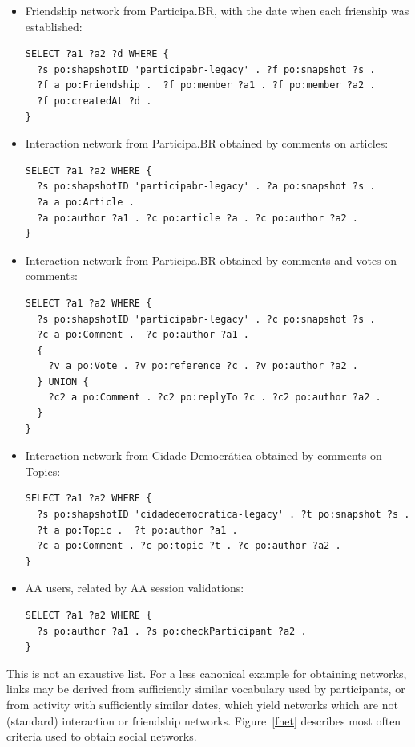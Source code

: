 \documentclass[data,datadescriptor,submit,moreauthors,pdftex]{Definitions/mdpi}
\begin{document}
\begin{itemize}
\begin{lstlisting}[language=spq]
}
\end{lstlisting}
  \item Friendship network from Participa.BR, with the date when each frienship was established:
\begin{lstlisting}[language=spq]
SELECT ?a1 ?a2 ?d WHERE { 
  ?s po:shapshotID 'participabr-legacy' . ?f po:snapshot ?s .
  ?f a po:Friendship .  ?f po:member ?a1 . ?f po:member ?a2 .
  ?f po:createdAt ?d .
}
\end{lstlisting}
  \item Interaction network from Participa.BR obtained by comments on articles:
\begin{lstlisting}[language=spq]
SELECT ?a1 ?a2 WHERE {
  ?s po:shapshotID 'participabr-legacy' . ?a po:snapshot ?s .
  ?a a po:Article .
  ?a po:author ?a1 . ?c po:article ?a . ?c po:author ?a2 .
}
\end{lstlisting}
  \item Interaction network from Participa.BR obtained by comments and votes on comments:
\begin{lstlisting}[language=spq]
SELECT ?a1 ?a2 WHERE { 
  ?s po:shapshotID 'participabr-legacy' . ?c po:snapshot ?s .
  ?c a po:Comment .  ?c po:author ?a1 .
  {
    ?v a po:Vote . ?v po:reference ?c . ?v po:author ?a2 .
  } UNION {
    ?c2 a po:Comment . ?c2 po:replyTo ?c . ?c2 po:author ?a2 .
  }
}
\end{lstlisting}
  \item Interaction network from Cidade Democrática obtained by comments on Topics:
\begin{lstlisting}[language=spq]
SELECT ?a1 ?a2 WHERE { 
  ?s po:shapshotID 'cidadedemocratica-legacy' . ?t po:snapshot ?s .
  ?t a po:Topic .  ?t po:author ?a1 .
  ?c a po:Comment . ?c po:topic ?t . ?c po:author ?a2 .
}
\end{lstlisting}
  \item AA users, related by AA session validations:
\begin{lstlisting}[language=spq]
SELECT ?a1 ?a2 WHERE { 
  ?s po:author ?a1 . ?s po:checkParticipant ?a2 .
}
\end{lstlisting}
\end{itemize}

This is not an exaustive list.
For a less canonical example for obtaining networks,
links may be derived from sufficiently similar vocabulary used by participants,
or from activity with sufficiently similar dates,
which yield networks which are not (standard) interaction or friendship networks.
Figure~\ref{fnet} describes most often criteria used to obtain social networks.
\end{document}
